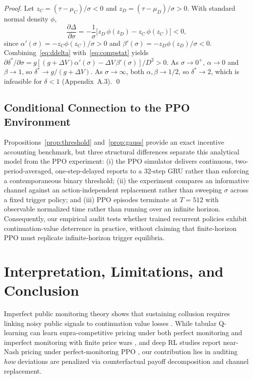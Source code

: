 \documentclass{article}
\begin{document}
\begin{proof}
Let $z_C=(\tau-\mu_C)/\sigma < 0$ and $z_D=(\tau-\mu_D)/\sigma > 0$. With standard normal density $\phi$,
\begin{equation}\label{eq:ddelta}
\frac{\partial\Delta}{\partial\sigma}
= -\frac{1}{\sigma}\bigl[z_D\,\phi(z_D)-z_C\,\phi(z_C)\bigr] < 0,
\end{equation}
since $\alpha'(\sigma)=-z_C\phi(z_C)/\sigma > 0$ and $\beta'(\sigma)=-z_D\phi(z_D)/\sigma < 0$. Combining~\eqref{eq:ddelta} with~\eqref{eq:compstat} yields $\partial\delta^*/\partial\sigma = g[(g+\Delta V)\alpha'(\sigma)-\Delta V\,\beta'(\sigma)]/D^2 > 0$. As $\sigma\to 0^+$, $\alpha\to 0$ and $\beta\to 1$, so $\delta^*\to g/(g+\Delta V)$. As $\sigma\to\infty$, both $\alpha,\beta\to 1/2$, so $\delta^*\to 2$, which is infeasible for $\delta<1$ (Appendix~A.3). \qed
\end{proof}

\subsection{Conditional Connection to the PPO Environment}

Propositions~\ref{prop:threshold} and~\ref{prop:gauss} provide an exact incentive accounting benchmark, but three structural differences separate this analytical model from the PPO experiment: (i) the PPO simulator delivers continuous, two-period-averaged, one-step-delayed reports to a 32-step GRU rather than enforcing a contemporaneous binary threshold; (ii) the experiment compares an informative channel against an action-independent replacement rather than sweeping $\sigma$ across a fixed trigger policy; and (iii) PPO episodes terminate at $T=512$ with observable normalized time rather than running over an infinite horizon. Consequently, our empirical audit tests whether trained recurrent policies exhibit continuation-value deterrence in practice, without claiming that finite-horizon PPO must replicate infinite-horizon trigger equilibria.

\section{Interpretation, Limitations, and Conclusion}

Imperfect public monitoring theory shows that sustaining collusion requires linking noisy public signals to continuation value losses \citep{green1984noncooperative, abreu1990toward, fudenberg1994folk}. While tabular Q-learning can learn supra-competitive pricing under both perfect monitoring \citep{calvano2020artificial} and imperfect monitoring with finite price wars \citep{calvano2021algorithmic}, and deep RL studies report near-Nash pricing under perfect-monitoring PPO \citep{deng2025exploring}, our contribution lies in auditing \emph{how} deviations are penalized via counterfactual payoff decomposition and channel replacement.
\end{document}
